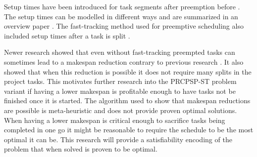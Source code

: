 Setup times have been introduced for task segments after preemption before \cite{RN13}. The setup times can be modelled in different ways and are summarized in an overview paper \cite{RN62}. The fast-tracking method used for preemptive scheduling also included setup times after a task is split \cite{RN7}.

Newer research showed that even without fast-tracking preempted tasks can sometimes lead to a makespan reduction contrary to previous research \cite{RN1}. It also showed that when this reduction is possible it does not require many splits in the project tasks. This motivates further research into the PRCPSP-ST problem variant if having a lower makespan is profitable enough to have tasks not be finished once it is started. The algorithm used to show that makespan reductions are possible is meta-heuristic and does not provide proven optimal solutions. When having a lower makespan is critical enough to sacrifice tasks being completed in one go it might be reasonable to require the schedule to be the most optimal it can be. This research will provide a satisfiability encoding of the problem that when solved is proven to be optimal.
